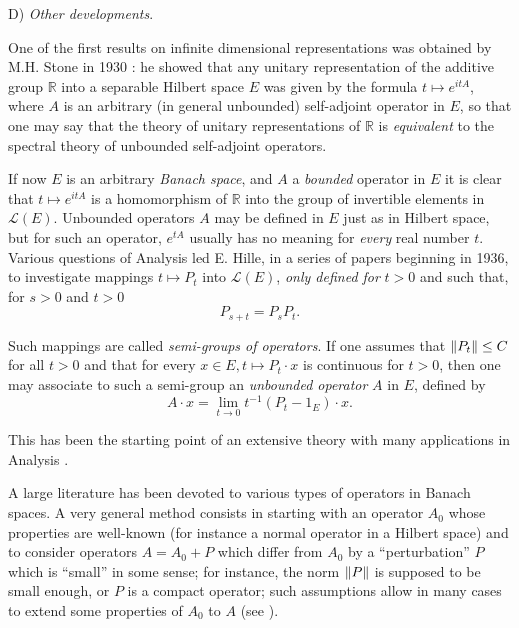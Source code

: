 \documentclass[12pt,a4paper,leqno,twoside]{extbook}
\DeclarePairedDelimiter{\norm}{\lVert}{\rVert}
\newcommand{\R}{\mathbb{R}}
\begin{document}
D) \emph{Other developments}.

One of the first results on infinite dimensional representations was obtained by M.H. Stone in 1930 \cite{206}: he showed that any unitary representation of the additive group \(\R\) into a separable Hilbert space \(E\) was given by the formula \(t \mapsto e^{itA}\), where \(A\) is an arbitrary (in general unbounded) self-adjoint operator in \(E\), so that one may say that the theory of unitary representations of \(\R\) is \emph{equivalent} to the spectral theory of unbounded self-adjoint operators.

If now \(E\) is an arbitrary \emph{Banach space}, and \(A\) a \emph{bounded} operator in \(E\) it is clear that \(t \mapsto e^{itA}\) is a homomorphism of \(\R\) into the group of invertible elements in \(\mathcal{L}(E)\). Unbounded operators \(A\) may be defined in \(E\) just as in Hilbert space, but for such an operator, \(e^{tA}\) usually has no meaning for \emph{every} real number \(t\). Various questions of Analysis led E. Hille, in a series of papers beginning in 1936, to investigate mappings \(t \mapsto P_t\) into \(\mathcal{L}(E)\), \emph{only defined for} \(t > 0\) and such that, for \(s > 0\) and \(t > 0\)
\begin{equation}
    \label{eq:7.65}
    P_{s+t} = P_s P_t.
\end{equation}

Such mappings are called \emph{semi-groups of operators}. If one assumes that \(\norm{P_t} \leq C\) for all \(t > 0\) and that for every \(x \in E, t \mapsto P_t \cdot x\) is continuous for \(t > 0\), then one may associate to such a semi-group an \emph{unbounded operator} \(A\) in \(E\), defined by
\begin{equation}
    \label{eq:7.66}
    A \cdot x = \lim_{t \to 0} t^{-1} (P_t - 1_E) \cdot x.
\end{equation}

This has been the starting point of an extensive theory with many applications in Analysis \cite{115}.

A large literature has been devoted to various types of operators in Banach spaces. A very general method consists in starting with an operator \(A_0\) whose properties are well-known (for instance a normal operator in a Hilbert space) and to consider operators \(A = A_0 + P\) which differ from \(A_0\) by a ``perturbation'' \(P\) which is ``small'' in some sense; for instance, the norm \(\norm{P}\) is supposed to be small enough, or \(P\) is a compact operator; such assumptions allow in many cases to extend some properties of \(A_0\) to \(A\) (see \cite{124}).
\end{document}
